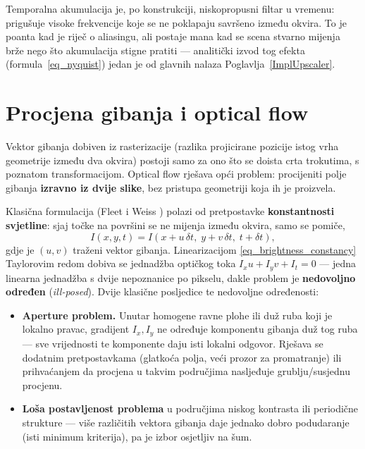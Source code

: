 \documentclass{mathos}
\begin{document}
Temporalna akumulacija je, po konstrukciji, niskopropusni filtar u vremenu:
prigušuje visoke frekvencije koje se ne poklapaju savršeno između okvira.
To je poanta kad je riječ o aliasingu, ali postaje mana kad se scena stvarno
mijenja brže nego što akumulacija stigne pratiti — analitički izvod tog
efekta (formula~\eqref{eq_nyquist}) jedan je od glavnih nalaza
Poglavlja~\ref{ImplUpscaler}.

\section{Procjena gibanja i optical flow}

Vektor gibanja dobiven iz rasterizacije (razlika projicirane pozicije istog
vrha geometrije između dva okvira) postoji samo za ono što se doista crta
trokutima, s poznatom transformacijom. Optical flow rješava opći problem:
procijeniti polje gibanja \textbf{izravno iz dvije slike}, bez pristupa
geometriji koja ih je proizvela.

Klasična formulacija (Fleet i Weiss \cite{FleetWeiss}) polazi od
pretpostavke \textbf{konstantnosti svjetline}: sjaj točke na površini se ne
mijenja između okvira, samo se pomiče,
\begin{equation}
I(x, y, t) = I(x + u\,\delta t,\; y + v\,\delta t,\; t + \delta t),
\label{eq_brightness_constancy}
\end{equation}
gdje je $(u,v)$ traženi vektor gibanja. Linearizacijom
\eqref{eq_brightness_constancy} Taylorovim redom dobiva se jednadžba
optičkog toka $I_x u + I_y v + I_t = 0$ — jedna linearna jednadžba s dvije
nepoznanice po pikselu, dakle problem je \textbf{nedovoljno određen}
(\emph{ill-posed}). Dvije klasične posljedice te nedovoljne određenosti:

\begin{itemize}
\item \textbf{Aperture problem.} Unutar homogene ravne plohe ili duž ruba
koji je lokalno pravac, gradijent $I_x, I_y$ ne određuje komponentu gibanja
duž tog ruba — sve vrijednosti te komponente daju isti lokalni odgovor.
Rješava se dodatnim pretpostavkama (glatkoća polja, veći prozor za
promatranje) ili prihvaćanjem da procjena u takvim područjima nasljeđuje
grublju/susjednu procjenu.
\item \textbf{Loša postavljenost problema} u područjima niskog kontrasta ili
periodične strukture — više različitih vektora gibanja daje jednako dobro
podudaranje (isti minimum kriterija), pa je izbor osjetljiv na šum.
\end{itemize}
\end{document}
